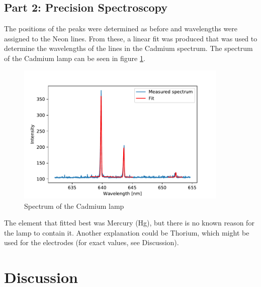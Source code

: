 \documentclass[12pt]{article}
\begin{document}
\subsection{Part 2: Precision Spectroscopy}
	The positions of the peaks were determined as before and wavelengths were assigned to the Neon lines. From these, a linear fit was produced that was used to determine the wavelengths of the lines in the Cadmium spectrum. The spectrum of the Cadmium lamp can be seen in figure \ref{fig:cd_spectrum}.
\begin{figure}[H]
\centering
\includegraphics[width=0.9\textwidth]{fig/cd_spectrum_nm.pdf}
\caption{Spectrum of the Cadmium lamp}
\label{fig:cd_spectrum}
\end{figure} 
The element that fitted best was Mercury (Hg), but there is no known reason for the lamp to contain it. Another explanation could be Thorium, which might be used for the electrodes (for exact values, see Discussion).

\section{Discussion}
\end{document}
